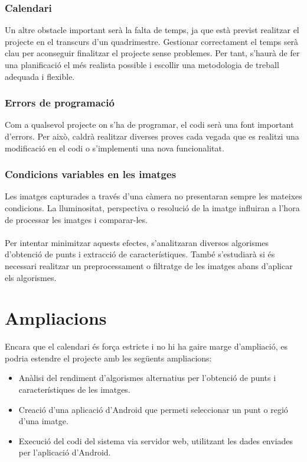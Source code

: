 	\subsubsection{Calendari}
		Un altre obstacle important serà la falta de temps, ja que està previst realitzar el projecte en el transcurs d'un quadrimestre. Gestionar correctament el temps serà clau per aconseguir
		finalitzar el projecte sense problemes. Per tant, s'haurà de fer una planificació el més realista possible i escollir una metodologia de treball adequada i flexible.
	\subsubsection{Errors de programació}
		Com a qualsevol projecte on s'ha de programar, el codi serà una font important d'errors. Per això, caldrà realitzar diverses proves cada vegada que es realitzi una modificació en el codi
		o s'implementi una nova funcionalitat.
	\subsubsection{Condicions variables en les imatges}
		Les imatges capturades a través d'una càmera no presentaran sempre les mateixes condicions. La lluminositat, perspectiva o resolució de la imatge 
		influiran a l'hora de processar les imatges i comparar-les.\\\\
		Per intentar minimitzar aquests efectes, s'analitzaran diversos algorismes d'obtenció de punts i extracció de característiques. 
		També s'estudiarà si és necessari realitzar un preprocessament o filtratge de les imatges abans d'aplicar els algorismes.
\newpage
\section{Ampliacions}
	Encara que el calendari és força estricte i no hi ha gaire marge d'ampliació, es podria estendre el projecte amb les següents ampliacions:\\
	\begin{itemize}
		\item Anàlisi del rendiment d'algorismes alternatius per l'obtenció de punts i característiques de les imatges.
		\item Creació d'una aplicació d'Android que permeti seleccionar un punt o regió d'una imatge.
		\item Execució del codi del sistema via servidor web, utilitzant les dades enviades per l'aplicació d'Android.
	\end{itemize}
